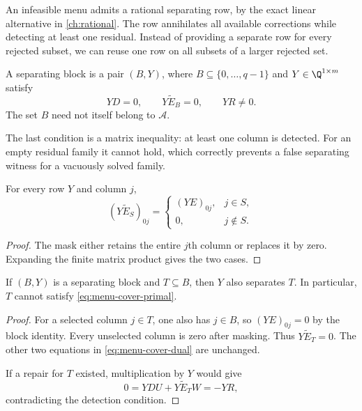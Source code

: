 An infeasible menu admits a rational separating row, by the exact linear alternative in \cref{ch:rational}. The row annihilates all available corrections while detecting at least one residual. Instead of providing a separate row for every rejected subset, we can reuse one row on all subsets of a larger rejected set.

\begin{definition}
A separating block is a pair $(B,Y)$, where $B\subseteq\{0,\ldots,q-1\}$ and $Y\in\Q^{1\times m}$ satisfy
\begin{equation}
 YD=0,\qquad Y\widetilde E_B=0,\qquad YR\ne0.
 \label{eq:menu-cover-dual}
\end{equation}
The set $B$ need not itself belong to $\mathcal A$.
\end{definition}

The last condition is a matrix inequality: at least one column is detected. For an empty residual family it cannot hold, which correctly prevents a false separating witness for a vacuously solved family.

\begin{lemma}
For every row $Y$ and column $j$,
\[
 (Y\widetilde E_S)_{0j}=
 \begin{cases}
 (YE)_{0j},&j\in S,\\
 0,&j\notin S.
 \end{cases}
\]
\end{lemma}
\begin{proof}
The mask either retains the entire $j$th column or replaces it by zero. Expanding the finite matrix product gives the two cases.
\end{proof}

\begin{theorem}
If $(B,Y)$ is a separating block and $T\subseteq B$, then $Y$ also separates $T$. In particular, $T$ cannot satisfy \eqref{eq:menu-cover-primal}.
\end{theorem}
\begin{proof}
For a selected column $j\in T$, one also has $j\in B$, so $(YE)_{0j}=0$ by the block identity. Every unselected column is zero after masking. Thus $Y\widetilde E_T=0$. The other two equations in \eqref{eq:menu-cover-dual} are unchanged.

If a repair for $T$ existed, multiplication by $Y$ would give
\[
 0=YDU+Y\widetilde E_TW=-YR,
\]
contradicting the detection condition.
\end{proof}

